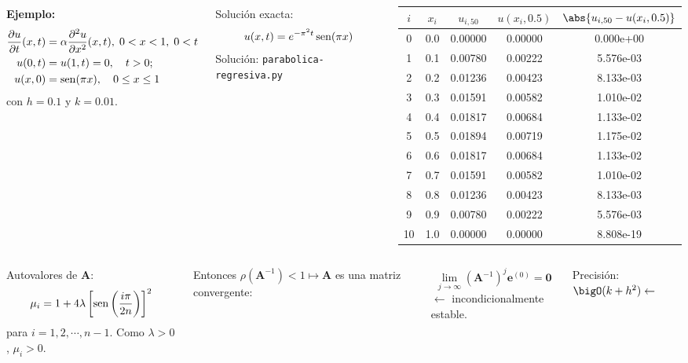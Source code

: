 \documentclass[9pt, aspectratio=169]{beamer}
\begin{document}
\begin{frame}
\begin{columns}
\textbf{Ejemplo:} 
\begin{align*}
\frac{\partial u}{\partial t} (x, t) &= \alpha \frac{\partial^2 u}{\partial x^2}(x, t), \; 0 < x < 1, \; 0 < t \\
u(0, t) &= u(1, t) = 0, \quad t > 0; \\
u(x, 0) &= \operatorname{sen}(\pi x), \quad 0 \leq x \leq 1
\end{align*}
con $h = 0.1$ y \alert{$k = 0.01$}.

Solución exacta:
\[u(x, t) = e^{-\pi^2 t} \operatorname{sen} (\pi x) \]
\centering Solución: \texttt{parabolica-regresiva.py}

\begin{center}
\begin{tabular}{ccccc}
\toprule
$i$ & $x_i$ & $u_{i,50}$ & $u(x_i, 0.5)$ & $\abs{u_{i, 50} - u(x_i, 0.5)}$ \\
\midrule
0 & 0.0 & 0.00000 & 0.00000 & 0.000e+00 \\
1 & 0.1 & 0.00780 & 0.00222 & 5.576e-03 \\
2 & 0.2 & 0.01236 & 0.00423 & 8.133e-03 \\
3 & 0.3 & 0.01591 & 0.00582 & 1.010e-02 \\
4 & 0.4 & 0.01817 & 0.00684 & 1.133e-02 \\
5 & 0.5 & 0.01894 & 0.00719 & 1.175e-02 \\
6 & 0.6 & 0.01817 & 0.00684 & 1.133e-02 \\
7 & 0.7 & 0.01591 & 0.00582 & 1.010e-02 \\
8 & 0.8 & 0.01236 & 0.00423 & 8.133e-03 \\
9 & 0.9 & 0.00780 & 0.00222 & 5.576e-03 \\
10 & 1.0 & 0.00000 & 0.00000 & 8.808e-19 \\
\bottomrule
\end{tabular} 
\end{center}
\end{columns} \pause
\vspace{1em}
\begin{columns}
\cx
Autovalores de $\bm{A}$:
\[ \mu_i = 1 + 4 \lambda \left[ \operatorname{sen} \left(\frac{i \pi}{2 n}\right) \right]^2 \]
para $i = 1, 2, \cdots, n-1$. Como $\lambda > 0$, $\mu_i > 0$.

\cx
Entonces $\rho(\bm{A}^{-1}) < 1 \mapsto \bm{A}$ es una matriz convergente:
\begin{columns}
\[ \lim_{j \to \infty} (\bm{A}^{-1})^j \bm{e}^{(0)} = \bm{0} \]
$\leftarrow$ \alert{incondicionalmente estable}.
\end{columns} \pause
\centering Precisión: $\bigO(k + h^2) \leftarrow$ \faThumbsODown
\end{columns}
\end{frame}
\end{document}
